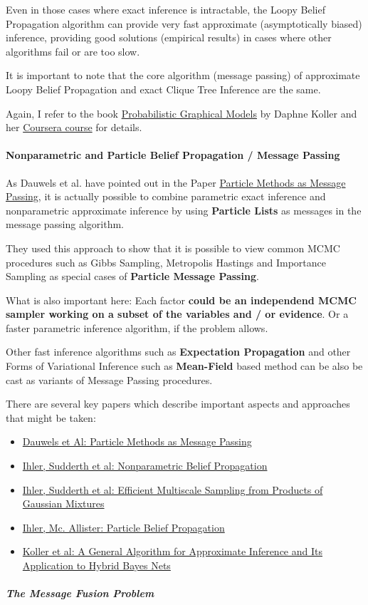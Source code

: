 Even in those cases where exact inference is intractable, the Loopy
Belief Propagation algorithm can provide very fast approximate
(asymptotically biased) inference, providing good solutions (empirical
results) in cases where other algorithms fail or are too slow.

It is important to note that the core algorithm (message passing) of
approximate Loopy Belief Propagation and exact Clique Tree Inference are
the same.

Again, I refer to the book
\href{http://mitpress.mit.edu/books/probabilistic-graphical-models}{Probabilistic
Graphical Models} by Daphne Koller and her
\href{https://www.coursera.org/course/pgm}{Coursera course} for details.

\paragraph{Nonparametric and Particle Belief Propagation / Message
Passing}

As Dauwels et al. have pointed out in the Paper
\href{http://www.dauwels.com/Papers/Particle.pdf}{Particle Methods as
Message Passing}, it is actually possible to combine parametric exact
inference and nonparametric approximate inference by using
\textbf{Particle Lists} as messages in the message passing algorithm.

They used this approach to show that it is possible to view common MCMC
procedures such as Gibbs Sampling, Metropolis Hastings and Importance
Sampling as special cases of \textbf{Particle Message Passing}.

What is also important here: Each factor \textbf{could be an independend
MCMC sampler working on a subset of the variables and / or evidence}. Or
a faster parametric inference algorithm, if the problem allows.

Other fast inference algorithms such as \textbf{Expectation Propagation}
and other Forms of Variational Inference such as \textbf{Mean-Field}
based method can be also be cast as variants of Message Passing
procedures.

There are several key papers which describe important aspects and
approaches that might be taken:

\begin{itemize}
\item
  \href{http://www.dauwels.com/Papers/Particle.pdf}{Dauwels et Al:
  Particle Methods as Message Passing}
\item
  \href{http://ssg.mit.edu/nbp/papers/nips03.pdf}{Ihler, Sudderth et al:
  Nonparametric Belief Propagation}
\item
  \href{http://ssg.mit.edu/nbp/papers/nips03.pdf}{Ihler, Sudderth et al:
  Efficient Multiscale Sampling from Products of Gaussian Mixtures}
\item
  \href{http://machinelearning.wus\%20tl.edu/mlpapers/paper\_files/AISTATS09\_IhlerM.pdf}{Ihler,
  Mc. Allister: Particle Belief Propagation}
\item
  \href{http://robotics.stanford.edu/~koller/Papers/Koller+al:UAI99.pdf}{Koller
  et al: A General Algorithm for Approximate Inference and Its
  Application to Hybrid Bayes Nets}
\end{itemize}
\subparagraph{The Message Fusion Problem}

